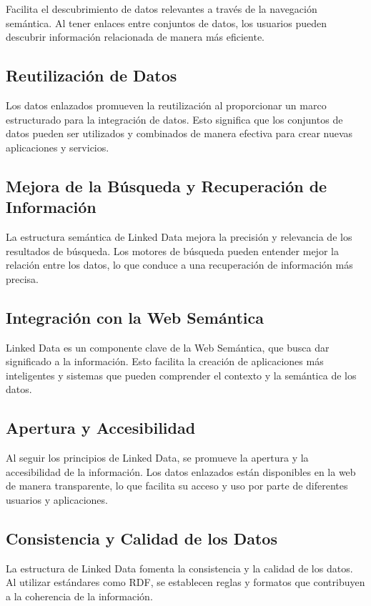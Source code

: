 \documentclass[11pt]{report}
\begin{document}
		Facilita el descubrimiento de datos relevantes a través de la navegación semántica. Al tener enlaces entre conjuntos de datos, los usuarios pueden descubrir información relacionada de manera más eficiente.
\subsection*{Reutilización de Datos}

		Los datos enlazados promueven la reutilización al proporcionar un marco estructurado para la integración de datos. Esto significa que los conjuntos de datos pueden ser utilizados y combinados de manera efectiva para crear nuevas aplicaciones y servicios.
\subsection*{Mejora de la Búsqueda y Recuperación de Información}

		La estructura semántica de Linked Data mejora la precisión y relevancia de los resultados de búsqueda. Los motores de búsqueda pueden entender mejor la relación entre los datos, lo que conduce a una recuperación de información más precisa.
\subsection*{Integración con la Web Semántica}

		Linked Data es un componente clave de la Web Semántica, que busca dar significado a la información. Esto facilita la creación de aplicaciones más inteligentes y sistemas que pueden comprender el contexto y la semántica de los datos.
\subsection*{Apertura y Accesibilidad}

		Al seguir los principios de Linked Data, se promueve la apertura y la accesibilidad de la información. Los datos enlazados están disponibles en la web de manera transparente, lo que facilita su acceso y uso por parte de diferentes usuarios y aplicaciones.
\subsection*{Consistencia y Calidad de los Datos}

		La estructura de Linked Data fomenta la consistencia y la calidad de los datos. Al utilizar estándares como RDF, se establecen reglas y formatos que contribuyen a la coherencia de la información.
\end{document}
